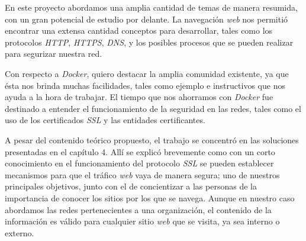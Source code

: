 
En este proyecto abordamos una amplia cantidad de temas de manera resumida, con un gran potencial 
de estudio por delante. La navegación \emph{web} nos permitió encontrar una 
extensa cantidad conceptos para desarrollar, tales como los protocolos \emph{HTTP}, \emph{HTTPS}, \emph{DNS}, 
y los posibles procesos que se pueden realizar para segurizar nuestra red.

Con respecto a \emph{Docker}, quiero destacar la amplia comunidad existente, ya que ésta 
nos brinda muchas facilidades, tales como ejemplo e instructivos que nos ayuda 
 a la hora de trabajar. El tiempo que 
nos ahorramos con \emph{Docker} fue destinado a entender el funcionamiento de la seguridad en las redes, 
tales como el uso de los certificados \emph{SSL} y las entidades certificantes.

A pesar del contenido teórico propuesto, el trabajo se concentró en las soluciones presentadas 
en el capítulo 4. Allí se explicó brevemente como con un corto conocimiento en el funcionamiento 
del protocolo \emph{SSL} se pueden establecer mecanismos para que el tráfico \emph{web} vaya de manera segura; 
uno de nuestros principales objetivos, junto con el de concientizar a las personas de la 
importancia de conocer los sitios por los que se navega. Aunque en nuestro caso abordamos las 
redes pertenecientes a una organización, el contenido de la información es válido para cualquier 
sitio \emph{web} que se visita, ya sea interno o externo. 
